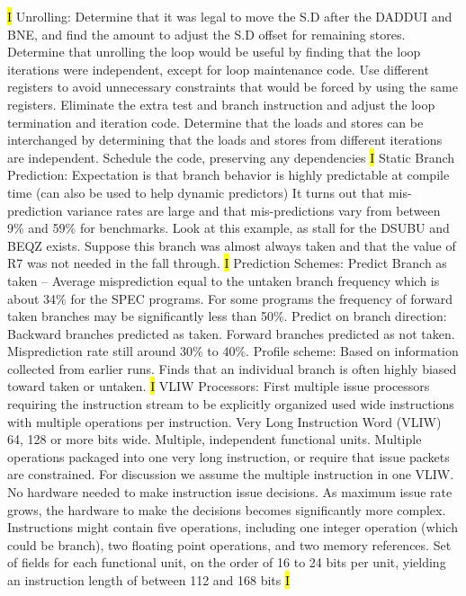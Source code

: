 \documentclass[fontsize=4pt]{scrartcl}
\begin{document}
\hl{I}
Unrolling: Determine that it was legal to move the S.D after the DADDUI and BNE, and find the amount to adjust the S.D offset for remaining stores. Determine that unrolling the loop would be useful by finding that the loop iterations were independent, except for loop maintenance code. Use different registers to avoid unnecessary constraints that would be forced by using the same registers. Eliminate the extra test and branch instruction and adjust the loop termination and iteration code. Determine that the loads and stores can be interchanged by determining that the loads and stores from different iterations are independent. Schedule the code, preserving any dependencies
\hl{I}
Static Branch Prediction: Expectation is that branch behavior is highly predictable at compile time (can also be used to help dynamic predictors) It turns out that mis-prediction variance rates are large and that mis-predictions vary from between 9\% and 59\% for benchmarks. Look at this example, as stall for the DSUBU and BEQZ exists. Suppose this branch was almost always taken and that the value of R7 was not needed in the fall through.
\hl{I}
Prediction Schemes: Predict Branch as taken – Average misprediction equal to the untaken branch frequency which is about 34\% for the SPEC programs. For some programs the frequency of forward taken branches may be significantly less than 50\%. Predict on branch direction: Backward branches predicted as taken. Forward branches predicted as not taken. Misprediction rate still around 30\% to 40\%. Profile scheme: Based on information collected from earlier runs. Finds that an individual branch is often highly biased toward taken or untaken.
\hl{I}
VLIW Processors: First multiple issue processors requiring the instruction stream to be explicitly organized used wide instructions with multiple operations per instruction. Very Long Instruction Word (VLIW) 64, 128 or more bits wide. Multiple, independent functional units. Multiple operations packaged into one very long instruction, or require that issue packets are constrained. For discussion we assume the multiple instruction in one VLIW. No hardware needed to make instruction issue decisions. As maximum issue rate grows, the hardware to make the decisions becomes significantly more complex. Instructions might contain five operations, including one integer operation (which could be branch), two floating point operations, and two memory references. Set of fields for each functional unit, on the order of 16 to 24 bits per unit, yielding an instruction length of between 112 and 168 bits
\hl{I}
\end{document}
